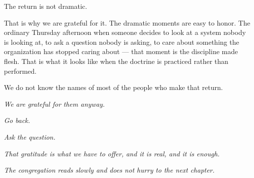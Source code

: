 The return is not dramatic.

That is why we are grateful for it. The dramatic moments are easy to honor. The ordinary Thursday afternoon when someone decides to look at a system nobody is looking at, to ask a question nobody is asking, to care about something the organization has stopped caring about --- that moment is the discipline made flesh. That is what it looks like when the doctrine is practiced rather than performed.

We do not know the names of most of the people who make that return.

\textit{We are grateful for them anyway.}

\textit{Go back.}

\textit{Ask the question.}

\textit{That gratitude is what we have to offer, and it is real, and it is enough.}

\vspace{2em}
\begin{center}
  \itshape The congregation reads slowly and does not hurry to the next chapter.
\end{center}
